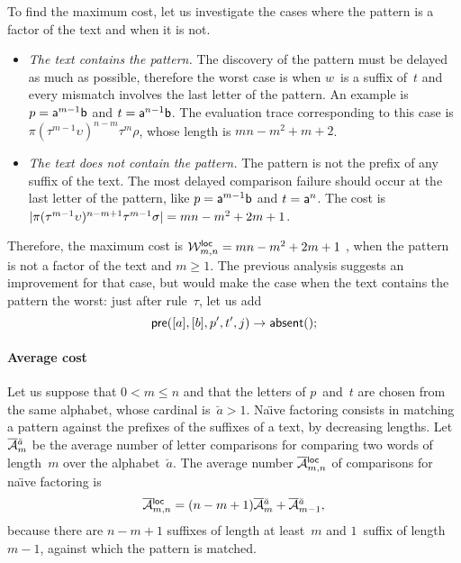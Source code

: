 To find the maximum cost, let us investigate the cases where the
pattern is a factor of the text and when it is not.
\begin{itemize}

  \item \emph{The text contains the pattern.} The discovery of the
    pattern must be delayed as much as possible, therefore the worst
    case is when \(w\)~is a suffix of~\(t\) and every mismatch
    involves the last letter of the pattern. An example is \(p =
    \word{a}^{m-1}\word{b}\) and \(t = \word{a}^{n-1}\word{b}\). The
    evaluation trace corresponding to this case is \(\pi
    (\tau^{m-1}\upsilon)^{n-m} \tau^m\rho\), whose length is
    \(mn-m^2+m+2\).

  \item \emph{The text does not contain the pattern.} The pattern is
    not the prefix of any suffix of the text. The most delayed
    comparison failure should occur at the last letter of the pattern,
    like \(p = \word{a}^{m-1}\word{b}\) and \(t = \word{a}^{n}\). The
    cost is \(\len{\pi(\tau^{m-1}\upsilon)^{n-m+1}\tau^{m-1}\sigma} =
    mn - m^2 + 2m + 1\).

\end{itemize}
Therefore, the maximum cost is \(\W{\fun{loc}}{m,n} = mn - m^2 + 2m +
1\) , when the pattern is not a factor
of the text and \(m \geqslant 1\). The previous analysis suggests an
improvement for that case, but would make the case when the text
contains the pattern the worst: just after rule~\(\tau\), let us add
\begin{equation*}
\belowdisplayskip=0pt
\fun{pre}([a],[b],p',t',j) \rightarrow \fun{absent}();\index{pre@\fun{pre/5}}
\end{equation*}

\paragraph{Average cost}

Let us suppose that \(0 < m \leqslant n\) and that the letters of
\(p\)~and~\(t\) are chosen from the same alphabet, whose cardinal
is~\(\breve{a} > 1\). Na\"{\i}ve factoring consists in matching a
pattern against the prefixes of the suffixes of a text, by decreasing
lengths. Let~\(\OM{\breve{a}}{m}\)  be
the average number of letter comparisons for comparing two words of
length~\(m\) over the alphabet~\(\breve{a}\). The average number
\(\OM{\fun{loc}}{m,n}\) of comparisons for na\"{\i}ve factoring is
\begin{equation}
\OM{\fun{loc}}{m,n} = (n-m+1)\OM{\breve{a}}{m} + \OM{\breve{a}}{m-1},
\label{eq:loc}
\end{equation}
because there are \(n-m+1\) suffixes of length at least~\(m\) and
\(1\)~suffix of length~\(m-1\), against which the pattern is matched.


